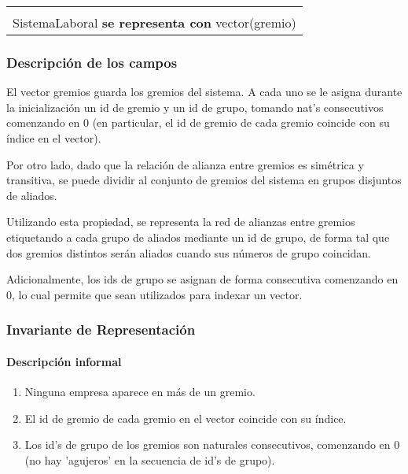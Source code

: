 \begin{center}
\begin{tabular}{|l|} 
\hline
\\
SistemaLaboral \textbf{se representa con} vector(gremio) \\
\hline
\end{tabular}
\end{center}

\subsubsection{Descripci\'on de los campos}

	El vector gremios guarda los gremios del sistema. A cada uno se le asigna durante la inicializaci\'on un id de gremio y un id de grupo, tomando nat's consecutivos comenzando en 0 (en particular, el id de gremio de cada gremio coincide con su \'indice en el vector).

	Por otro lado, dado que la relaci\'on de alianza entre gremios es sim\'etrica y transitiva, se puede dividir al conjunto de gremios del sistema en grupos disjuntos de aliados.

	Utilizando esta propiedad, se representa la red de alianzas entre gremios etiquetando a cada grupo de aliados mediante un id de grupo, de forma tal que dos gremios distintos ser\'an aliados cuando sus n\'umeros de grupo coincidan.

	Adicionalmente, los ids de grupo se asignan de forma consecutiva comenzando en 0, lo cual permite que sean utilizados para indexar un vector.

\subsubsection{Invariante de Representaci\'on}

\paragraph{Descripci\'on informal}

\begin{enumerate}
	\item Ninguna empresa aparece en m\'as de un gremio.
	\item El id de gremio de cada gremio en el vector coincide con su \'indice.
	\item Los id's de grupo de los gremios son naturales consecutivos, comenzando en 0 (no hay 'agujeros' en la secuencia de id's de grupo).
\end{enumerate}

